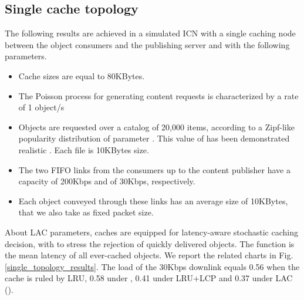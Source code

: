 \documentclass[conference]{IEEEtran}
\begin{document}
\subsection{Single cache topology}
The following results are achieved in a simulated ICN with a single caching node between the object consumers and the publishing server and with the following parameters. 
\begin{itemize}
	\item Cache sizes are equal to 80KBytes. 
	\item The Poisson process for generating content requests is characterized by a rate of 1 object/s
	\item Objects are requested over a catalog of 20,000 items, according to a  Zipf-like popularity distribution of
	parameter . This value of  has been demonstrated realistic \cite{Mitra:2011:CWV:1961659.1961662}. Each file is 10KBytes size.
	\item The two FIFO links from the consumers up to the content publisher have a capacity of 200Kbps and of 30Kbps, respectively. 
	\item Each object conveyed through these links has an average size of 10KBytes, that we also take as fixed packet size.
\end{itemize}
About LAC parameters, caches are equipped for latency-aware stochastic caching decision, with  to stress the rejection of quickly delivered objects. The function  is the mean latency of all ever-cached objects.
We report the related charts in Fig.\ref{single_topology_results}.
The load  of the 30Kbps downlink equals 0.56 when the cache is ruled by LRU, 0.58 under , 0.41 under LRU+LCP and 0.37 under LAC ().
\end{document}
